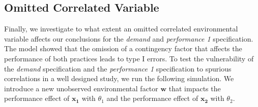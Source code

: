 \documentclass[12pt]{article}
\begin{document}
% 
% 

\subsection{Omitted Correlated Variable}

Finally, we investigate to what extent an omitted correlated environmental variable affects our conclusions for the \emph{demand} and \emph{performance 1} specification. The model showed that the omission of a contingency factor that affects the performance of both practices leads to type I errors. To test the vulnerability of the \emph{demand} specification and the \emph{performance 1} specification to spurious correlations in a well designed study, we run the following simulation. We introduce a new unobserved environmental factor \(\mathbf{w}\) that impacts the performance effect of \(\mathbf{x_1}\) with \(\theta_1\) and the performance effect of \(\mathbf{x_2}\) with \(\theta_2\). 
\end{document}
